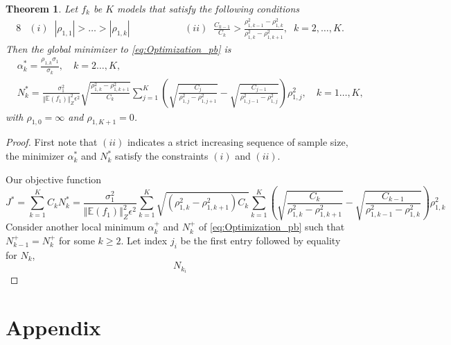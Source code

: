 \documentclass[final,3p,times,11pt]{elsarticle}
\newtheorem{theorem}{Theorem}%
\begin{document}
\begin{theorem}
\label{thm:Sample_size_est}
Let $f_k$ be $K$ models that satisfy the following conditions
%
\begin{alignat*}{8}
    &(i)\;\; |\rho_{1,1}|>\ldots>|\rho_{1,k}|& \qquad \qquad
    &(ii)\;\; \frac{C_{k-1}}{C_k}>\frac{\rho_{1,k-1}^2-\rho_{1,k}^2}{\rho_{1,k}^2-\rho_{1,k+1}^2},\;\;k=2,\ldots,K.
\end{alignat*}
%
Then the global minimizer to \eqref{eq:Optimization_pb} is 
\begin{align*}
    &\alpha_k^*=\frac{\rho_{1,k}\sigma_1}{\sigma_k}, \quad k=2\ldots, K,\\
    &N_k^*=\frac{\sigma_1^2}{\left\Vert\mathbb{E}(f_1) \right\Vert_{Z}^2\epsilon^2}\sqrt{\frac{\rho_{1,k}^2 - \rho_{1,k+1}^2}{C_k}}\sum_{j=1}^K\left(\sqrt{\frac{C_j}{\rho_{1,j}^2 - \rho_{1,j+1}^2}} - \sqrt{\frac{C_{j-1}}{\rho_{1,{j-1}}^2 - \rho_{1,j}^2}}\right)\rho_{1,j}^2, \quad k=1\ldots, K,
\end{align*}
with $\rho_{1,0}=\infty$ and $\rho_{1,K+1}=0$.

\end{theorem}
\begin{proof}
First note that $(ii)$ indicates a strict increasing sequence of sample size, the minimizer $\alpha_k^*$ and $N_k^*$ satisfy the constraints $(i)$ and $(ii)$.

Our objective function
\[
J^* = \sum_{k=1}^K C_kN_k^* = \frac{\sigma_1^2}{\left\Vert\mathbb{E}(f_1) \right\Vert_{Z}^2\epsilon^2}\sum_{k=1}^K\sqrt{\left(\rho_{1,k}^2 - \rho_{1,k+1}^2\right)C_k}\sum_{k=1}^K\left(\sqrt{\frac{C_k}{\rho_{1,k}^2 - \rho_{1,k+1}^2}} - \sqrt{\frac{C_{k-1}}{\rho_{1,{k-1}}^2 - \rho_{1,k}^2}}\right)\rho_{1,k}^2
\]
Consider another local minimum $\alpha_k^+$ and $N_k^+$ of \eqref{eq:Optimization_pb} such that $N_{k-1}^+ = N_{k}^+$ for some $k\ge 2$. Let index $j_i$ be the first entry followed by equality for $N_{k}$, 
\[
N_{k_i}
\]
\end{proof}





\section{Appendix}\label{sec:Appendix}





\end{document}
